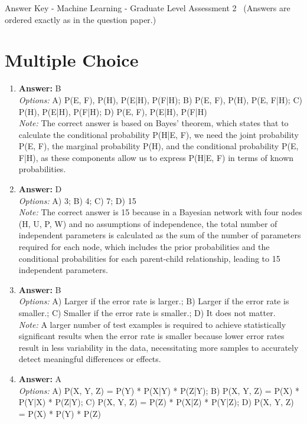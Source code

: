 \documentclass[12pt]{article}
\begin{document}
\begin{center}
Answer Key - Machine Learning - Graduate Level Assessment 2 \
\small (Answers are ordered exactly as in the question paper.)
\end{center}

\section*{Multiple Choice}
\begin{enumerate}[label=\arabic*.]
\item \textbf{Answer:} B
\\ \textit{Options:} A) P(E, F), P(H), P(E|H), P(F|H); B) P(E, F), P(H), P(E, F|H); C) P(H), P(E|H), P(F|H); D) P(E, F), P(E|H), P(F|H)
\\ \textit{Note:} The correct answer is based on Bayes' theorem, which states that to calculate the conditional probability P(H|E, F), we need the joint probability P(E, F), the marginal probability P(H), and the conditional probability P(E, F|H), as these components allow us to express P(H|E, F) in terms of known probabilities.
\item \textbf{Answer:} D
\\ \textit{Options:} A) 3; B) 4; C) 7; D) 15
\\ \textit{Note:} The correct answer is 15 because in a Bayesian network with four nodes (H, U, P, W) and no assumptions of independence, the total number of independent parameters is calculated as the sum of the number of parameters required for each node, which includes the prior probabilities and the conditional probabilities for each parent-child relationship, leading to 15 independent parameters.
\item \textbf{Answer:} B
\\ \textit{Options:} A) Larger if the error rate is larger.; B) Larger if the error rate is smaller.; C) Smaller if the error rate is smaller.; D) It does not matter.
\\ \textit{Note:} A larger number of test examples is required to achieve statistically significant results when the error rate is smaller because lower error rates result in less variability in the data, necessitating more samples to accurately detect meaningful differences or effects.
\item \textbf{Answer:} A
\\ \textit{Options:} A) P(X, Y, Z) = P(Y) * P(X|Y) * P(Z|Y); B) P(X, Y, Z) = P(X) * P(Y|X) * P(Z|Y); C) P(X, Y, Z) = P(Z) * P(X|Z) * P(Y|Z); D) P(X, Y, Z) = P(X) * P(Y) * P(Z)

\end{enumerate}
\end{document}
